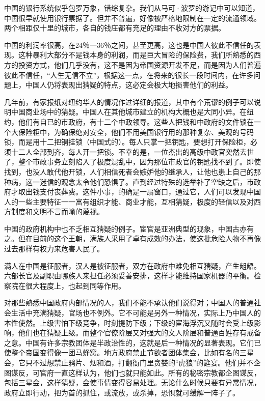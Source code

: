 \documentclass[12pt,oneside]{book}
\begin{document}
\begin{common-format}
中国的银行系统似乎包罗万象，错综复杂。我们从马可·波罗的游记中可以知道，中国很早就使用银行票据了。但并不普遍，好像被严格地限制在一定的流通领域。两个相距仅十里的城市，各自的钱庄都有充足的理由不收对方的票据。 

中国的利润率很高，在24％一36％之间，甚至更高，这也是中国人彼此不信任的表现。这种暴利大部分不是钱本身的利润，而是巨大冒险的保险费，我们所熟悉的西方的投资方式，他们几乎没有，这不是因为帝国资源开发不足，而是因为人们普遍彼此不信任，“人生无信不立”，根据这一点，在将来的很长一段时间内，在许多问题上，中国人仍将表现出猜疑的特点，这必定会极大地损害他们的利益。 

几年前，有家报纸对纽约华人的情况作过详细的报道，其中有个荒谬的例子可以说明中国商业场中的猜疑。中国人在其他城市建立的机构大概也是大同小异。在纽约，他们有自已的市政府，有十二个中政领导。这些人把钱和中政府的文件锁在一个大保险柜中，为确保绝对安全，他们不用美国银行用的那种复杂、美观的号码锁，而是用十二把铜挂锁（中国式的）。每人只掌一把钥匙，要想打开保险柜，必须十二人全部到齐，每人开一把锁。不幸的是，一位杰出的高级中政官突然去世了，整个市政事务立刻陷入了极度混乱中，因为那位市政官的钥匙找不到了。即使找到，也没人敢代他开锁，人们相信死者会嫉妒他的继承人，让他也患上自己的那种病，这一迷信的观念太令他们恐惧了。直到经过特殊的选举补了空缺之后，市政府才取出钱支付丧葬费。这件小事，的确是一扇窗口，通过它，人们可以发现中国人的一些主要特征一一富有组织才能、商业才能，互相猜疑，极度的轻信以及对西方制度和文明不言而喻的蔑视。 

中国的政府机构中也不乏相互猜疑的例子。宦官是亚洲典型的现象，中国古亦有之。但在目前的这个王朝，满族人采用了卓有成效的办法，使这批危险人物不再像过去那样有权力来危害人民了。 

满人在中国是征服者，汉人是被征服者，双方在政府中难免相互猜疑，产生龃龉。六部长官及副职由哪族人来担任必须妥善安排，这样才能维持国家机器的平衡。检察院在很大程度上，也起到同等作用。 

对那些熟悉中国政府内部情况的人，我们不能不承认他们说得对；中国人的普通社会生活中充满猜疑，官场也不例外。它不可能是另外一种情况，实际上乃中国人的本性使然。上级害怕下级竞争，时刻提防下级；下级的宦海浮沉又随时会受上级影响，他们也在猜疑上级。而整个官僚阶层又对强大的文人阶层和普通百姓存有戒备之意。中国有许多宗教团体是半政治性的，这就是后一种情况的显著表现。它们已使整个帝国变得像一团马蜂窝。地方政府禁止节欲者团体集会，比如有名的三星会，它只不过想禁止鸦片、烟和酒，打翻衙门里贪婪的“虎狼”的筵宴。他们并不企图谋反，可官府一直这样认为，他们也就只能如此。所有的秘密宗教都企图谋反，包括三星会，这样猜疑，会使事情变得容易处理。无论什么时候只要有异常情况，政府立即行动，把为首的抓住，或流放，或杀掉，恐惧就可缓解一阵子了。 


\end{common-format}
\end{document}
